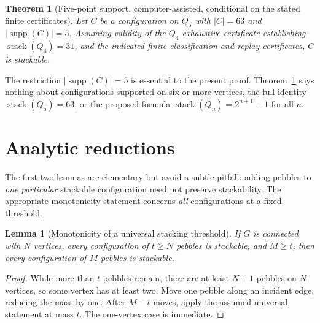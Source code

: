 \documentclass[11pt,a4paper]{article}
\newtheorem{theorem}{Theorem}
\newtheorem{lemma}{Lemma}
\newcommand{\stack}{\operatorname{stack}}
\newcommand{\supp}{\operatorname{supp}}
\begin{document}
\begin{theorem}[Five-point support, computer-assisted, conditional on the stated finite certificates]\label{thm:main}
Let $C$ be a configuration on $Q_5$ with $|C|=63$ and $|\supp(C)|=5$. Assuming validity of the $Q_4$ exhaustive certificate establishing $\stack(Q_4)=31$, and the indicated finite classification and replay certificates, $C$ is stackable.
\end{theorem}

The restriction $|\supp(C)|=5$ is essential to the present proof. Theorem~\ref{thm:main} says nothing about configurations supported on six or more vertices, the full identity $\stack(Q_5)=63$, or the proposed formula $\stack(Q_n)=2^{n+1}-1$ for all $n$.

\section{Analytic reductions}
The first two lemmas are elementary but avoid a subtle pitfall: adding pebbles to \emph{one particular} stackable configuration need not preserve stackability. The appropriate monotonicity statement concerns \emph{all} configurations at a fixed threshold.

\begin{lemma}[Monotonicity of a universal stacking threshold]\label{lem:monotone}
If $G$ is connected with $N$ vertices, every configuration of $t\ge N$ pebbles is stackable, and $M\ge t$, then every configuration of $M$ pebbles is stackable.
\end{lemma}
\begin{proof}
While more than $t$ pebbles remain, there are at least $N+1$ pebbles on $N$ vertices, so some vertex has at least two. Move one pebble along an incident edge, reducing the mass by one. After $M-t$ moves, apply the assumed universal statement at mass $t$. The one-vertex case is immediate.
\end{proof}
\end{document}

